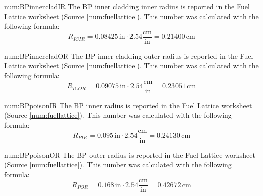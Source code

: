 \begin{numitem}{num:BPinnercladIR}
  The \ac{BP} inner cladding inner radius is reported in the Fuel Lattice worksheet (Source \ref{num:fuellattice}). This number was calculated with the following formula:
  \[
      R_{ICIR} = 0.08425\,\mathrm{in}\cdot 2.54 \mathrm{\frac{cm}{in}} = 0.21400\,\mathrm{cm}
  \]
  
\end{numitem}

\begin{numitem}{num:BPinnercladOR}
  The \ac{BP} inner cladding outer radius is reported in the Fuel Lattice worksheet (Source \ref{num:fuellattice}). This number was calculated with the following formula:
  \[
      R_{ICOR} = 0.09075\,\mathrm{in}\cdot 2.54 \mathrm{\frac{cm}{in}} = 0.23051\,\mathrm{cm}
  \]
  
\end{numitem}

\begin{numitem}{num:BPpoisonIR}
  The \ac{BP} inner radius is reported in the Fuel Lattice worksheet (Source \ref{num:fuellattice}). This number was calculated with the following formula:
  \[
      R_{PIR} = 0.095\,\mathrm{in}\cdot 2.54 \mathrm{\frac{cm}{in}} = 0.24130\,\mathrm{cm}
  \]
  
\end{numitem}

\begin{numitem}{num:BPpoisonOR}
  The \ac{BP} outer radius is reported in the Fuel Lattice worksheet (Source \ref{num:fuellattice}). This number was calculated with the following formula:
  \[
      R_{POR} = 0.168\,\mathrm{in}\cdot 2.54 \mathrm{\frac{cm}{in}} = 0.42672\,\mathrm{cm}
  \]
  
\end{numitem}

